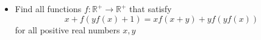 \documentclass[11pt]{scrartcl}
\begin{document}
\begin{itemize}[label=,itemsep=0.4em,leftmargin=0em]
\begin{comment}
            Assume $f(1) > 1$. Since $f$ is bijective, there exists $t < 1$ such that $f(t) = 1$. 
            
            $P(t,y) \ra f(y + t) = t^3f(y) + 1 > f(y) \lra 1 > (1 - t^3)f(y)$, which is absurd because $f$ is unbounded above. Therefore, $f(1) = 1$.
        \end{pro}
        \vocab{Claim 6:} $f(q) = q, \forall q \in \bb{Q^+} (4)$ 
        \begin{pro}
            Substituting $P(1,y)$ we get $f(y + 1) = f(y) + 1, \yro$. By induction, we can prove $f(y + n) = f(y) + n, \yro$ for $n \in \bb{Z^+}$. Letting $y \to 0^+$ we get $f(n) = n,\forall n \in \bb{Z^+}$.

            For $m,n \in \bb{Z^+}$, substituting $P\left(m,\frac{n}{m}\right)$ we get 
            \[
                    f(nm^2 + m) = m^3 + f\left(\frac{m}{n}\right) + f(m) \lra f\left(\frac{m}{n}\right) = \frac{m}{n}, \forall m,n \in \bb{Z^+}
            \]
        \end{pro}
        Now, for any real number $x > 0$, we choose a sequence $(u_n)$ such that $u_n = \frac{\lfloor nx \rfloor}{n}, \forall n \in \bb{Z^+}$. We have 
        \[
            \frac{nx - 1}{n} <  \frac{\lfloor nx \rfloor}{n} < \frac{nx + 1}{n} 
        \]
        Since $f$ is continuous on $\mathbb{R^+}$,
        \[
           \dlim \frac{nx - 1}{n} <\dlim u_n < \dlim\frac{nx + 1}{n} \ra \dlim u_n = x
        \]
        From $(4)$, substituting $x = u_n$ we get 
        \[
            \dlim f(u_n) = f(\dlim u_n) = \dlim u_n = x 
        \]
        Thus, the unique function that satisfies the conditions is $\boxed{f(x) = x, \xro}$.

    \end{comment}
    \item \begin{btvn}
        Find all functions $f: \mathbb{R^+} \to \mathbb{R^+}$ that satisfy
        \[
        x+f(y f(x)+1)=x f(x+y)+y f(y f(x))\tag{1}
        \]
        for all positive real numbers $x,y$
    \end{btvn}
    \begin{comment}
        Denote $P(x,y)$ as the substitution into $(1)$.

        Claim 1: $f$ is not bounded above.
Proof.
From $P\left(x,\frac{y}{f(x)} - 1\right)$ it follows that\[f(y) = xf\left(x + \frac{y-1}{f(x)}\right) + \frac{y - 1}{f(x)}f(y - 1) - x,\forall x > 0, y > 1 \tag{2}
    \]From $(2)$ as $y \to +\infty$, the right-hand side $\to +\infty$ so $\displaystyle \blim_{y \to +\infty} f(y) = +\infty$.


\end{comment}
\end{itemize}
\end{document}
